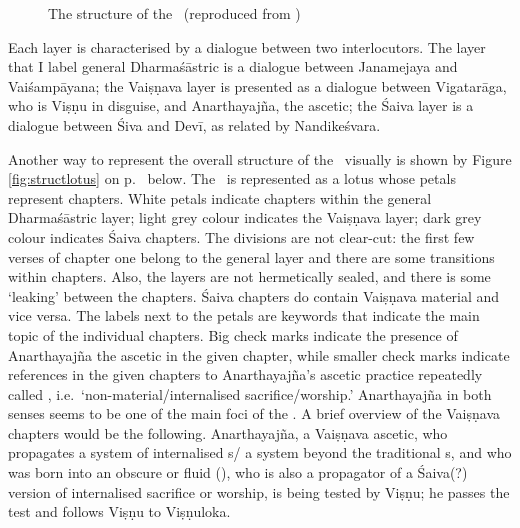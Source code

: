 \begin{figure}
\begin{tikzpicture}


\end{tikzpicture}
\caption[Structure of the \VSS]{The structure of the \VSS\ (reproduced from )\label{fig:struct2021}}
\end{figure}

Each layer is characterised by a dialogue between
two interlocutors. The layer that I label general 
Dharmaśāstric is a dialogue between Janamejaya and
Vaiśampāyana; the Vaiṣṇava layer is presented as
a dialogue between Vigatarāga, who is
Viṣṇu in disguise, and Anarthayajña,\label{anarthayajna_person} the ascetic;
the Śaiva layer is a dialogue between Śiva and Devī,
as related by Nandikeśvara.

Another way to represent the overall structure of the \VSS\
visually is shown by Figure \ref{fig:structlotus} 
on p.~\pageref{fig:structlotus} below. 
The \VSS\ is represented
as a lotus whose petals represent chapters. White petals indicate chapters within
the general Dharmaśāstric layer; light grey colour
indicates the Vaiṣṇava layer; dark grey colour indicates
Śaiva chapters. The divisions are not clear-cut: 
the first few verses of chapter one belong to
the general layer and there are some transitions
within chapters. Also, the layers are not hermetically
sealed, and there is some `leaking' between the chapters.
Śaiva chapters do contain Vaiṣṇava material and vice versa.
The labels next to the petals are keywords that indicate
the main topic of the individual chapters. Big check marks
indicate the presence of Anarthayajña the ascetic in
the given chapter, while smaller check marks indicate
references in the given chapters to Anarthayajña's
ascetic practice repeatedly called , 
i.e.\ `non-material\thinspace /\thinspace internali\-sed sacrifice/worship.'
Anarthayajña in both senses seems to be one of the 
main foci of the \VSS. A brief overview of 
the Vaiṣṇava chapters would be the following.
Anarthayajña, a Vaiṣṇava ascetic, who propagates 
a system of internalised s\thinspace /\thinspace
a system beyond the traditional \skt{āśrama}s, 
and who was born into an obscure or fluid  
(),
who is also a propagator of a Śaiva(?) version of 
internalised sacrifice or worship, is
being tested by Viṣṇu; he passes the test
and follows Viṣṇu to Viṣṇuloka.

